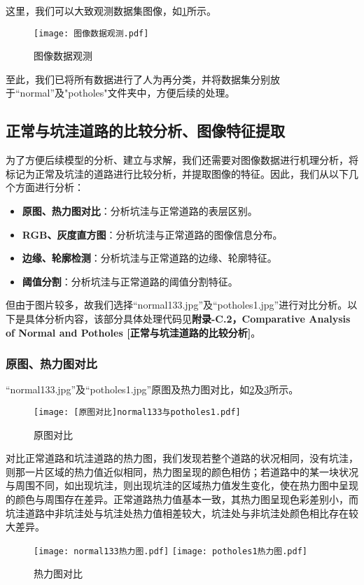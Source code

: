 \documentclass{MathorCupmodeling}
\begin{document}
	这里，我们可以大致观测数据集图像，如\textcolor{blue}{\cref{fig:图像数据观测}}所示。
	\begin{figure}[H]
		\centering
		\texttt{[image: 图像数据观测.pdf]}
		\caption{图像数据观测}
		\label{fig:图像数据观测}
	\end{figure}
	至此，我们已将所有数据进行了人为再分类，并将数据集分别放于“normal”及"potholes"文件夹中，方便后续的处理。
	\subsection{正常与坑洼道路的比较分析、图像特征提取}\label{分析}
	为了方便后续模型的分析、建立与求解，我们还需要对图像数据进行机理分析，将标记为正常及坑洼的道路进行比较分析，并提取图像的特征。因此，我们从以下几个方面进行分析：
	\begin{itemize}
		\item \textbf{原图、热力图对比}：分析坑洼与正常道路的表层区别。
		\item \textbf{RGB、灰度直方图}：分析坑洼与正常道路的图像信息分布。
		\item \textbf{边缘、轮廓检测}：分析坑洼与正常道路的边缘、轮廓特征。
		\item \textbf{阈值分割}：分析坑洼与正常道路的阈值分割特征。
	\end{itemize}
	
	但由于图片较多，故我们选择“normal133.jpg”及“potholes1.jpg”进行对比分析。以下是具体分析内容，该部分具体处理代码见\textbf{附录-C.2，Comparative Analysis of Normal and Potholes [正常与坑洼道路的比较分析]}。
	\subsubsection{原图、热力图对比}
	“normal133.jpg”及“potholes1.jpg”原图及热力图对比，如\textcolor{blue}{\cref{fig:原图对比}}及\textcolor{blue}{\cref{fig:热力图对比}}所示。
	\begin{figure}[H]
		\centering
			\centering
			\texttt{[image: [原图对比]normal133与potholes1.pdf]}
			\caption{原图对比}
			\label{fig:原图对比}
	\end{figure}
	
	对比正常道路和坑洼道路的热力图，我们发现若整个道路的状况相同，没有坑洼，则那一片区域的热力值近似相同，热力图呈现的颜色相仿；若道路中的某一块状况与周围不同，如出现坑洼，则出现坑洼的区域热力值发生变化，使在热力图中呈现的颜色与周围存在差异。正常道路热力值基本一致，其热力图呈现色彩差别小，而坑洼道路中非坑洼处与坑洼处热力值相差较大，坑洼处与非坑洼处颜色相比存在较大差异。
	\begin{figure}[H]
		\centering
		\texttt{[image: normal133热力图.pdf]}
		\hspace{0.3in}
		\texttt{[image: potholes1热力图.pdf]}
		\caption{热力图对比}
		\label{fig:热力图对比}
	\end{figure}
\end{document}
